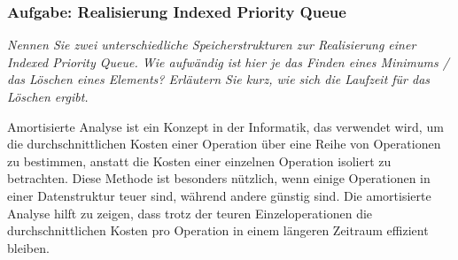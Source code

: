\documentclass{article}
\begin{document}
\subsubsection{Aufgabe: Realisierung Indexed Priority Queue \textcolor{ForestGreen}{\CheckmarkBold}}
\textit{Nennen Sie zwei unterschiedliche Speicherstrukturen zur Realisierung einer Indexed Priority Queue. Wie aufwändig ist hier je das Finden eines Minimums / das Löschen eines Elements? Erläutern Sie kurz, wie sich die Laufzeit für das Löschen ergibt. }
\begin{definitionbox}[title=Amortisierter Aufwand]
Amortisierte Analyse ist ein Konzept in der Informatik, das verwendet wird, um die durchschnittlichen Kosten einer Operation über eine Reihe von Operationen zu bestimmen, anstatt die Kosten einer einzelnen Operation isoliert zu betrachten. Diese Methode ist besonders nützlich, wenn einige Operationen in einer Datenstruktur teuer sind, während andere günstig sind. Die amortisierte Analyse hilft zu zeigen, dass trotz der teuren Einzeloperationen die durchschnittlichen Kosten pro Operation in einem längeren Zeitraum effizient bleiben.
\end{definitionbox}
\end{document}
